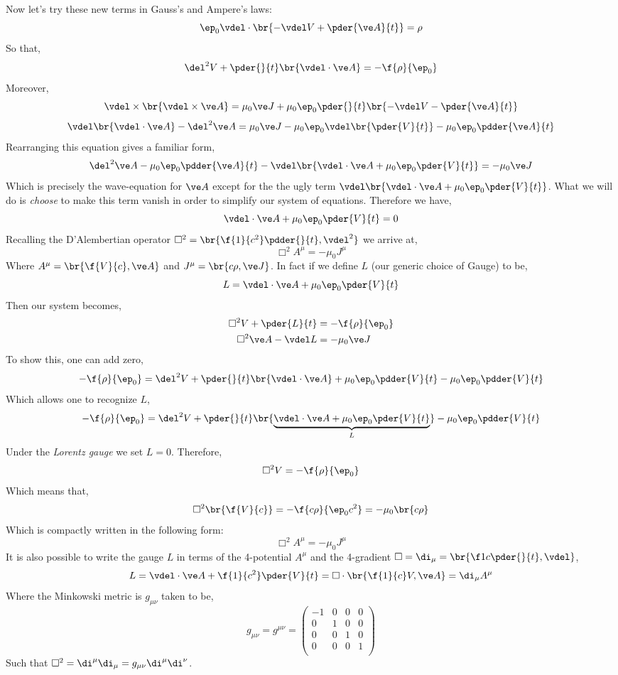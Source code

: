 \documentclass{article}
\begin{document}
Now let's try these new terms in Gauss's and Ampere's laws:
\[ \ep_0\vdel \cdot \br{-\vdel V + \pder{\ve A}{t}} = \rho \]
So that,
\[ \del^2 V + \pder{}{t}\br{\vdel \cdot \ve A} = -\f{\rho}{\ep_0} \]
Moreover,
\[ \vdel \times \br{\vdel \times \ve A} = \mu_0 \ve J + \mu_0 \ep_0 \pder{}{t} \br{-\vdel V - \pder{\ve A}{t}}\]
\[ \vdel \br{\vdel \cdot \ve A} - \del^2 \ve A = \mu_0 \ve J - \mu_0 \ep_0 \vdel \br{\pder{V}{t}} - \mu_0 \ep_0 \pdder{\ve A}{t} \]
Rearranging this equation gives a familiar form,
\[ \del^2 \ve A - \mu_0 \ep_0 \pdder{\ve A}{t} - \vdel \br{\vdel \cdot \ve A + \mu_0 \ep_0 \pder{V}{t}} = - \mu_0 \ve J \]
Which is precisely the wave-equation for $\ve A$ except for the the ugly term $\vdel\br{\vdel \cdot \ve A + \mu_0 \ep_0 \pder{V}{t}}$. What we will do is \textit{choose} to make this term vanish in order to simplify our system of equations. Therefore we have,
\[ \vdel \cdot \ve A + \mu_0 \ep_0 \pder{V}{t} = 0 \]
Recalling the D'Alembertian operator $\Box^2 = \br{\f{1}{c^2} \pdder{}{t}, \vdel^2}$ we arrive at,
\[ \Box^2 A^{\mu} = -\mu_0 J^{\mu} \]
Where $A^{\mu} = \br{\f{V}{c}, \ve A}$ and $J^{\mu} = \br{c \rho, \ve J}$. In fact if we define $L$ (our generic choice of Gauge) to be,
\[ L = \vdel \cdot \ve A + \mu_0 \ep_0 \pder{V}{t} \]
Then our system becomes,
\begin{align*}
    \Box^2 V + \pder{L}{t} &= - \f{\rho}{\ep_0} \\
    \Box^2 \ve A - \vdel L &= - \mu_0 \ve J
\end{align*}
To show this, one can add zero,
\[ -\f{\rho}{\ep_0} = \del^2 V + \pder{}{t}\br{\vdel \cdot \ve A} + \mu_0 \ep_0 \pdder{V}{t} - \mu_0 \ep_0 \pdder{V}{t}\]
Which allows one to recognize $L$,
\[ -\f{\rho}{\ep_0} = \del^2 V + \pder{}{t}\br{\underbrace{\vdel \cdot \ve A + \mu_0 \ep_0 \pder{V}{t}}_{L}} - \mu_0 \ep_0 \pdder{V}{t}\]
Under the \textit{Lorentz gauge} we set $L = 0$. Therefore,
\[ \Box^2 V = - \f{\rho}{\ep_0} \]
Which means that,
\[ \Box^2 \br{\f{V}{c}} = - \f{c\rho}{\ep_0 c^2} = - \mu_0 \br{c \rho} \]
Which is compactly written in the following form:
\[ \Box^2 A^{\mu} = -\mu_0 J^{\mu} \]
It is also possible to write the gauge $L$ in terms of the 4-potential $A^{\mu}$ and the 4-gradient $\Box = \di_\mu = \br{\f1c\pder{}{t}, \vdel}$,
\[ L = \vdel \cdot \ve A + \f{1}{c^2} \pder{V}{t} = \Box \cdot \br{\f{1}{c} V, \ve A}  = \di_{\mu} A^{\mu} \]
Where the Minkowski metric is $g_{\mu\nu}$ taken to be,
\[ g_{\mu\nu} = g^{\mu\nu} = \begin{pmatrix}
    -1 & 0 & 0 & 0 \\
     0 & 1 & 0 & 0 \\
     0 & 0 & 1 & 0 \\
     0 & 0 & 0 & 1 \\
\end{pmatrix} \]
Such that $\Box^2 = \di^{\mu}\di_{\mu} = g_{\mu\nu} \di^{\mu}\di^{\nu}$.  \\
\end{document}
